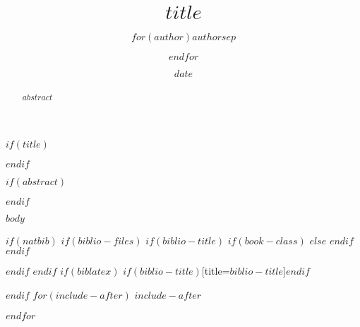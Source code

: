 \documentclass{tufte-handout}
\title{$title$}
\author{$for(author)$$author$$sep$ \and $endfor$}
\date{$date$}
\begin{document}
$if(title)$
\maketitle
$endif$
 
\bigskip

$if(abstract)$
\begin{abstract}
$abstract$
\end{abstract}
$endif$

$body$
 
$if(natbib)$
$if(biblio-files)$
$if(biblio-title)$
$if(book-class)$
\renewcommand\bibname{$biblio-title$}
$else$
\renewcommand\refname{$biblio-title$}
$endif$
$endif$


 
$endif$
$endif$
$if(biblatex)$
\printbibliography$if(biblio-title)$[title=$biblio-title$]$endif$
 
$endif$
$for(include-after)$
$include-after$
 
$endfor$
\end{document}
